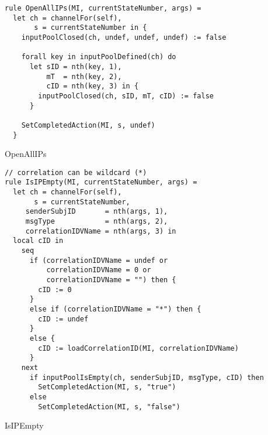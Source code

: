 \begin{listing}[H]
\begin{verbatim}
rule OpenAllIPs(MI, currentStateNumber, args) =
  let ch = channelFor(self),
       s = currentStateNumber in {
    inputPoolClosed(ch, undef, undef, undef) := false

    forall key in inputPoolDefined(ch) do
      let sID = nth(key, 1),
          mT  = nth(key, 2),
          cID = nth(key, 3) in {
        inputPoolClosed(ch, sID, mT, cID) := false
      }

    SetCompletedAction(MI, s, undef)
  }
\end{verbatim}
\caption{OpenAllIPs}
\label{lst:asm:OpenAllIPs}
\end{listing}




\begin{listing}[H]
\begin{verbatim}
// correlation can be wildcard (*)
rule IsIPEmpty(MI, currentStateNumber, args) =
  let ch = channelFor(self),
       s = currentStateNumber,
     senderSubjID       = nth(args, 1),
     msgType            = nth(args, 2),
     correlationIDVName = nth(args, 3) in
  local cID in
    seq
      if (correlationIDVName = undef or
          correlationIDVName = 0 or
          correlationIDVName = "") then {
        cID := 0
      }
      else if (correlationIDVName = "*") then {
        cID := undef
      }
      else {
        cID := loadCorrelationID(MI, correlationIDVName)
      }
    next
      if inputPoolIsEmpty(ch, senderSubjID, msgType, cID) then
        SetCompletedAction(MI, s, "true")
      else
        SetCompletedAction(MI, s, "false")
\end{verbatim}
\caption{IsIPEmpty}
\label{lst:asm:IsIPEmpty}
\end{listing}




